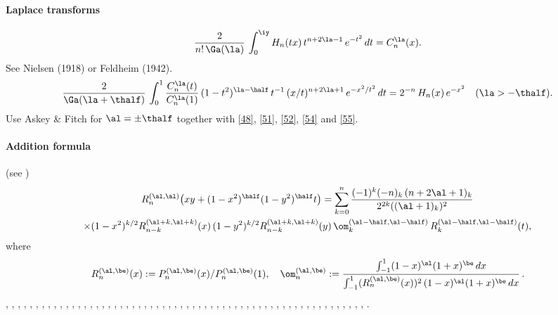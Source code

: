 \documentclass[envcountchap,graybox]{svmono}
\begin{document}
\paragraph{Laplace transforms}
\begin{equation}
\frac2{n!\,\Ga(\la)}\,
\int_0^\iy H_n(tx)\,t^{n+2\la-1}\,e^{-t^2}\,dt=C_n^\la(x).
\label{56}
\end{equation}
See Nielsen \cite[p.48, (4) with p.47, (1) and p.28, (10)]{K4} (1918)
or Feldheim \cite[(28)]{K3} (1942).
\begin{equation}
\frac2{\Ga(\la+\thalf)}\,\int_0^1 \frac{C_n^\la(t)}{C_n^\la(1)}\,
(1-t^2)^{\la-\half}\,t^{-1}\,(x/t)^{n+2\la+1}\,e^{-x^2/t^2}\,dt
=2^{-n}\,H_n(x)\,e^{-x^2}\quad(\la>-\thalf).
\label{46}
\end{equation}
Use Askey \& Fitch \cite[(3.29)]{K2} for $\al=\pm\thalf$ together with
\eqref{48}, \eqref{51}, \eqref{52}, \eqref{54} and \eqref{55}.
\paragraph{Addition formula} (see \mycite{AAR}{(9.8.5$'$)]})
\begin{multline}
R_n^{(\al,\al)}\big(xy+(1-x^2)^\half(1-y^2)^\half t\big)
=\sum_{k=0}^n \frac{(-1)^k(-n)_k\,(n+2\al+1)_k}{2^{2k}((\al+1)_k)^2}\\
\times(1-x^2)^{k/2} R_{n-k}^{(\al+k,\al+k)}(x)\,(1-y^2)^{k/2} R_{n-k}^{(\al+k,\al+k)}(y)\,
\om_k^{(\al-\half,\al-\half)}\,R_k^{(\al-\half,\al-\half)}(t),
\label{108}
\end{multline}
where
\[
R_n^{(\al,\be)}(x):=P_n^{(\al,\be)}(x)/P_n^{(\al,\be)}(1),\quad
\om_n^{(\al,\be)}:=\frac{\int_{-1}^1 (1-x)^\al(1+x)^\be\,dx}
{\int_{-1}^1 (R_n^{(\al,\be)}(x))^2\,(1-x)^\al(1+x)^\be\,dx}\,.
\]
%
\cite{Abram}, \cite{Ahmed+86}, \cite{AndrewsAskeyRoy}, \cite{Area+I}, \cite{Askey67}, \cite{Askey74}, \cite{Askey75},
\cite{Askey89I}, \cite{AskeyFitch}, \cite{AskeyKoornRahman}, \cite{Berg}, \cite{BilodeauI},
\cite{BojanovNikolov}, \cite{Brafman51}, \cite{Brafman57I}, \cite{Brown},
\cite{BustozIsmail82}, \cite{BustozIsmail83}, \cite{BustozIsmail89}, \cite{BustozSavage79},
\cite{BustozSavage80}, \cite{Carlitz61II}, \cite{Chihara78}, \cite{Common}, \cite{Danese},
\cite{Dette94}, \cite{DijksmaKoorn}, \cite{DilcherStolarsky}, \cite{Dimitrov96},
\cite{Dimitrov2003}, \cite{Doha2002II}, \cite{Driver}, \cite{ElbertLaforgia86I},
\cite{ElbertLaforgia86II}, \cite{ElbertLaforgia90}, \cite{Erdelyi+}, \cite{Exton96},
\cite{Gasper69}, \cite{Gasper72II}, \cite{Gasper85}, \cite{Grad}, \cite{Ismail74},
\cite{Ismail2005II}, \cite{Koekoek2000}, \cite{Koorn88}, \cite{Laforgia}, \cite{LewanowiczI},
\cite{Lorch}, \cite{Mathai}, \cite{Nagel}, \cite{Nikiforov+}, \cite{NikiforovUvarov},
\cite{RahmanShah}, \cite{Rainville}, \cite{Reimer}, \cite{Sartoretto}, \cite{Srivastava71},
\cite{Szego75}, \cite{Temme}, \cite{Viswanathan}, \cite{Zayed}.
\end{document}
